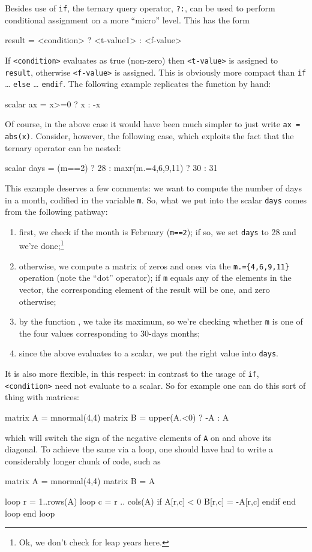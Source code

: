 Besides use of \texttt{if}, the ternary query operator, \texttt{?:},
can be used to perform conditional assignment on a more ``micro''
level. This has the form
\begin{code}
result = <condition> ? <t-value1> : <f-value>
\end{code}
If \texttt{<condition>} evaluates as true (non-zero) then
\texttt{<t-value>} is assigned to \texttt{result}, otherwise
\texttt{<f-value>} is assigned. This is obviously more compact than
\texttt{if} \dots{} \texttt{else} \dots{} \texttt{endif}. The
following example replicates the  function by hand:
\begin{code}
scalar ax = x>=0 ? x : -x
\end{code}
Of course, in the above case it would have been much simpler to just
write \texttt{ax = abs(x)}. Consider, however, the following case,
which exploits the fact that the ternary operator can be nested:
\begin{code}
scalar days = (m==2) ? 28 : maxr(m.={4,6,9,11}) ? 30 : 31
\end{code}
This example deserves a few comments: we want to compute the number of
days in a month, codified in the variable \texttt{m}. So, what we put into
the scalar \texttt{days} comes from the following pathway:
\begin{enumerate}
\item first, we check if the month is February (\texttt{m==2}); if so,
  we set \texttt{days} to 28 and we're done;\footnote{Ok, we don't
    check for leap years here.}
\item otherwise, we compute a matrix of zeros and ones via the
  \verb|m.={4,6,9,11}| operation (note the ``dot'' operator); if
  \texttt{m} equals any of the elements in the vector, the
  corresponding element of the result will be one, and zero otherwise;
\item by the function , we take its maximum, so we're
  checking whether \texttt{m} is one of the four values corresponding
  to 30-days months;
\item since the above evaluates to a scalar, we put the right value
  into \texttt{days}.
\end{enumerate}

It is also
more flexible, in this respect: in contrast to the usage of
\texttt{if}, \texttt{<condition>} need not evaluate to a scalar.  So
for example one can do this sort of thing with matrices:
\begin{code}
matrix A = mnormal(4,4)
matrix B = upper(A.<0) ? -A : A
\end{code}
which will switch the sign of the negative elements of \texttt{A} on
and above its diagonal. To achieve the same via a loop, one should
have had to write a considerably longer chunk of code, such as
\begin{code}
matrix A = mnormal(4,4)
matrix B = A

loop r = 1..rows(A)
  loop c = r .. cols(A)
     if A[r,c] < 0
       B[r,c] = -A[r,c]
     endif
  end loop
end loop
\end{code}

